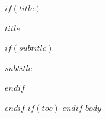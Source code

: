 \documentclass[11pt]{article}
\begin{document}
$if(title)$
\begin{titlepage}
\centering
\vspace*{\fill}
{\Huge\bfseries $title$\par}
$if(subtitle)$
\vspace{1.25em}
{\Large $subtitle$\par}
$endif$
\vspace*{\fill}
\end{titlepage}
$endif$
$if(toc)$
\tableofcontents
\clearpage
{}
$endif$
$body$
\end{document}
